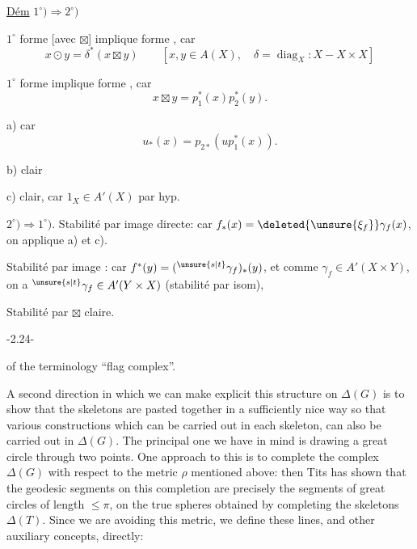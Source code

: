 
\uline{Dém} $1^\circ)\Longrightarrow2^\circ)$

$1^\circ$ forme  [avec $\boxtimes$] implique forme , car
\[
x\odot y=\delta^*(x\boxtimes y)\qquad[x,y\in A(X),\quad\delta=\operatorname{diag}_X:X-X\times X]
\]

$1^\circ$ forme  implique forme , car
\[
x\boxtimes y=p_1^*(x)p_2^*(y).
\]

a) car
\[
u_*(x)=p_{2*}(u p_1^*(x)).
\]

b) clair

c) clair, car $1_X\in A'(X)$ par hyp.

$2^\circ)\Longrightarrow1^\circ)$. Stabilité par image  directe: car $f_*(x)=\deleted{\unsure{\xi_f}}\gamma_f(x)$, on applique a) et c).

Stabilité par image  : car $f^*(y)=({}^{\unsure{s|t}}\gamma_f)_*(y)$, et comme $\gamma_f\in A'(X\times Y)$, on a ${}^{\unsure{s|t}}\gamma_f\in A'(Y\times X)$ (stabilité par isom),

Stabilité par $\boxtimes$ claire.
\begin{center}-2.24-\end{center}
of the terminology ``flag complex''.

A second direction in which we can make explicit this structure on $\Delta(G)$ is to show that the skeletons are pasted together in a sufficiently nice way so that various constructions which can be carried out in each skeleton, can also be carried out in $\Delta(G)$. The principal one we have in mind is drawing a great circle through two points. One approach to this is to complete the complex $\Delta(G)$ with respect to the metric $\rho$ mentioned above: then Tits has shown that the geodesic segments on this completion are precisely the segments of great circles of length $\leq\pi$, on the true spheres obtained by completing the skeletons $\Delta(T)$. Since we are avoiding this metric, we define these lines, and other auxiliary concepts, directly:

